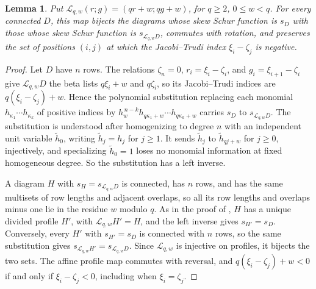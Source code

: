 \documentclass[11pt,a4paper]{amsart}
\numberwithin{equation}{section}
\theoremstyle{plain}
\newtheorem{lemma}[theorem]{Lemma}
\theoremstyle{definition}
\begin{document}
\begin{lemma}\label{lem:gluing-row-transport}
Put \(\mathcal L_{q,w}(r;g)=(qr+w;qg+w)\), for \(q\ge2\), \(0\le w<q\).  For every connected \(D\), this map bijects the diagrams whose skew Schur function is \(s_D\) with those whose skew Schur function is \(s_{\mathcal L_{q,w}D}\), commutes with rotation, and preserves the set of positions \((i,j)\) at which the Jacobi--Trudi index \(\xi_i-\zeta_j\) is negative.
\end{lemma}
\begin{proof}
Let \(D\) have \(n\) rows.  The relations \(\zeta_n=0\), \(r_i=\xi_i-\zeta_i\), and \(g_i=\xi_{i+1}-\zeta_i\) give \(\mathcal L_{q,w}D\) the beta lists \(q\xi_i+w\) and \(q\zeta_i\), so its Jacobi--Trudi indices are \(q(\xi_i-\zeta_j)+w\).  Hence the polynomial substitution replacing each monomial \(h_{\kappa_1}\cdots h_{\kappa_k}\) of positive indices by \(h_w^{\,n-k}h_{q\kappa_1+w}\cdots h_{q\kappa_k+w}\) carries \(s_D\) to \(s_{\mathcal L_{q,w}D}\).  The substitution is understood after homogenizing to degree \(n\) with an independent unit variable \(\tilde h_0\), writing \(\tilde h_j=h_j\) for \(j\ge1\).  It sends \(\tilde h_j\) to \(\tilde h_{qj+w}\) for \(j\ge0\), injectively, and specializing \(\tilde h_0=1\) loses no monomial information at fixed homogeneous degree.  So the substitution has a left inverse.

A diagram \(H\) with \(s_H=s_{\mathcal L_{q,w}D}\) is connected, has \(n\) rows, and has the same multisets of row lengths and adjacent overlaps, so all its row lengths and overlaps minus one lie in the residue \(w\) modulo \(q\).  As in the proof of , \(H\) has a unique divided profile \(H'\), with \(\mathcal L_{q,w}H'=H\), and the left inverse gives \(s_{H'}=s_D\).  Conversely, every \(H'\) with \(s_{H'}=s_D\) is connected with \(n\) rows, so the same substitution gives \(s_{\mathcal L_{q,w}H'}=s_{\mathcal L_{q,w}D}\).  Since \(\mathcal L_{q,w}\) is injective on profiles, it bijects the two sets.  The affine profile map commutes with reversal, and \(q(\xi_i-\zeta_j)+w<0\) if and only if \(\xi_i-\zeta_j<0\), including when \(\xi_i=\zeta_j\).
\end{proof}
\end{document}
